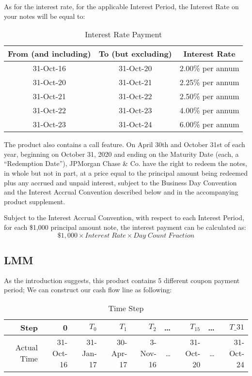 \documentclass[paper = letterpaper, fontsize=12pt]{article}
\begin{document}
As for the interest rate, for the applicable Interest Period, the Interest Rate on your notes will be equal to:
\begin{table}[htbp]
  \centering
    \begin{tabular}{ccc}
    \toprule
    \textbf{From (and including)} & \textbf{To (but excluding)} & \textbf{Interest Rate} \\
    \midrule
    31-Oct-16 & 31-Oct-20 & 2.00\% per annum \\
    31-Oct-20 & 31-Oct-21 & 2.25\% per annum \\
    31-Oct-21 & 31-Oct-22 & 2.50\% per annum \\
    31-Oct-22 & 31-Oct-23 & 4.00\% per annum \\
    31-Oct-23 & 31-Oct-24 & 6.00\% per annum \\
    \bottomrule
    \end{tabular}%
   \caption{Interest Rate Payment}
  \label{tab:addlabel}%
\end{table}%

The product also contains a call feature. On April 30th and October 31st of each year, beginning on October 31, 2020 and ending on the Maturity Date (each, a “Redemption Date”), JPMorgan Chase \& Co. have the right to redeem the notes, in whole but not in part, at a price equal to the principal amount being redeemed plus any accrued and unpaid interest, subject to the Business Day Convention and the Interest Accrual Convention described below and in the accompanying product supplement.

Subject to the Interest Accrual Convention, with respect to each Interest Period, for each \$1,000 principal amount note, the interest payment can be calculated as:
\[
	\$1,000 \times Interest\;Rate \times Day\;Count\;Fraction
\]


\subsection{LMM}
As the introduction suggests, this product contains 5 different coupon payment period; We can construct our cash flow line as following:
\begin{table}[htbp]
  \centering
    \begin{tabular}{rrrrrrrrr}
    \toprule
    Step  & 0     & $T_0$ & $T_1$ & $T_2$ & …     & $T_{15}$ & …     & $T\_{31}$ \\
    \midrule
    Actual Time & 31-Oct-16 & 31-Jan-17 & 30-Apr-17 & 3-Nov-16 & …     & 31-Oct-20 & …     & 31-Oct-24 \\
    \bottomrule
    \end{tabular}%
      \caption{Time Step}
  \label{tab:addlabel}%
\end{table}%
\end{document}
